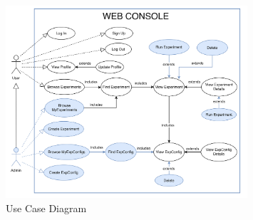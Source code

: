 \begin{figure}[ht!]
    \centering
    \includegraphics[width=0.8\textwidth]{images/2_analisys/FL_use_case.png}
    \caption{Use Case Diagram}
    \label{fig:use_case_diagram}
\end{figure}

\newpage
